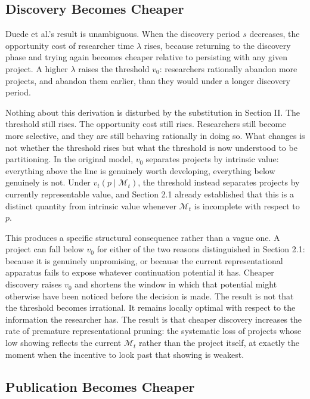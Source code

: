 \documentclass[11pt]{article}
\begin{document}
\subsection{Discovery Becomes Cheaper}

Duede et al.'s result is unambiguous. When the discovery period $s$ decreases, the opportunity cost of researcher time $\lambda$ rises, because returning to the discovery phase and trying again becomes cheaper relative to persisting with any given project. A higher $\lambda$ raises the threshold $v_0$: researchers rationally abandon more projects, and abandon them earlier, than they would under a longer discovery period.

Nothing about this derivation is disturbed by the substitution in Section II. The threshold still rises. The opportunity cost still rises. Researchers still become more selective, and they are still behaving rationally in doing so. What changes is not whether the threshold rises but what the threshold is now understood to be partitioning. In the original model, $v_0$ separates projects by intrinsic value: everything above the line is genuinely worth developing, everything below genuinely is not. Under $v_t(p \mid \mathcal{M}_t)$, the threshold instead separates projects by currently representable value, and Section 2.1 already established that this is a distinct quantity from intrinsic value whenever $\mathcal{M}_t$ is incomplete with respect to $p$.

This produces a specific structural consequence rather than a vague one. A project can fall below $v_0$ for either of the two reasons distinguished in Section 2.1: because it is genuinely unpromising, or because the current representational apparatus fails to expose whatever continuation potential it has. Cheaper discovery raises $v_0$ and shortens the window in which that potential might otherwise have been noticed before the decision is made. The result is not that the threshold becomes irrational. It remains locally optimal with respect to the information the researcher has. The result is that cheaper discovery increases the rate of premature representational pruning: the systematic loss of projects whose low showing reflects the current $\mathcal{M}_t$ rather than the project itself, at exactly the moment when the incentive to look past that showing is weakest.

\subsection{Publication Becomes Cheaper}
\end{document}
